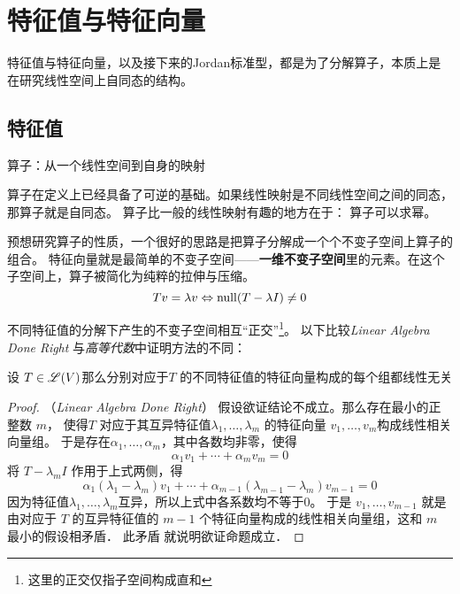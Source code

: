 \chapter{特征值与特征向量}
特征值与特征向量，以及接下来的Jordan标准型，都是为了分解算子，本质上是在研究线性空间上自同态的结构。

\section{特征值}
\begin{definition}
    算子：从一个线性空间到自身的映射
\end{definition}

算子在定义上已经具备了可逆的基础。如果线性映射是不同线性空间之间的同态，那算子就是自同态。
算子比一般的线性映射有趣的地方在于： 算子可以求幂。

预想研究算子的性质，一个很好的思路是把算子分解成一个个不变子空间上算子的组合。
特征向量就是最简单的不变子空间——\textbf{一维不变子空间}里的元素。在这个子空间上，算子被简化为纯粹的拉伸与压缩。
\[
    Tv=\lambda v \Leftrightarrow \operatorname{null}(T-\lambda I)\neq {0}
\]

不同特征值的分解下产生的不变子空间相互``正交''\footnote{这里的正交仅指子空间构成直和}。
以下比较\textit{Linear Algebra Done Right} 与\textit{高等代数}中证明方法的不同：

\begin{theorem}
    设 \(T \in \mathscr{L}(V)\)那么分别对应于\(T\) 的不同特征值的特征向量构成的每个组都线性无关
\end{theorem}

\begin{proof}
    （\textit{Linear Algebra Done Right}）
    假设欲证结论不成立。那么存在最小的正整数 \(m\)， 使得\(T\)
    对应于其互异特征值\(\lambda_1, \dots ,\lambda_{m}\)
    的特征向量 \(v_1, \dots, v_m\)构成线性相关向量组。
    于是存在\(\alpha_1, \dots ,\alpha_{m}\)，其中各数均非零，使得
    \[\alpha_1 v_1 + \cdots + \alpha_m v_m = 0\]
    将 \(T-\lambda_{m}I\) 作用于上式两侧，得
    \[
        \alpha_1 (\lambda_1 - \lambda_m)v_1 + \cdots +
        \alpha_{m-1} (\lambda_{m-1} - \lambda_m)v_{m-1} = 0
    \]
    因为特征值\(\lambda_1,\dots ,\lambda_{m}\)互异，所以上式中各系数均不等于0。
    于是 \(v_1, \dots , v_{m-1}\) 就是由对应于 \(T\)
    的互异特征值的 \(m- 1\) 个特征向量构成的线性相关向量组，这和 \(m\) 最小的假设相矛盾． 此矛盾
    就说明欲证命题成立．
\end{proof}

